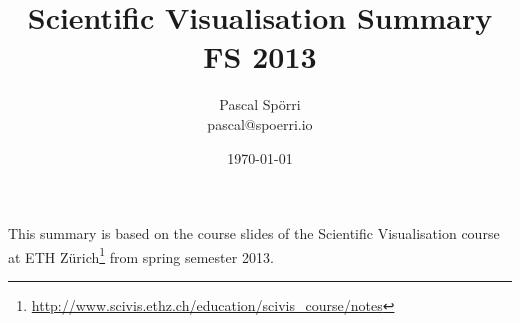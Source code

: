 \documentclass[a4paper]{scrartcl}
\author{Pascal Spörri\\pascal@spoerri.io}
\title{Scientific Visualisation Summary\\ FS 2013\\ }
\date{\today}
\begin{document}
\maketitle
This summary is based on the course slides of the Scientific Visualisation course at ETH Zürich\footnote{\url{http://www.scivis.ethz.ch/education/scivis_course/notes}} from spring semester 2013.
\newpage
\tableofcontents

\end{document}

